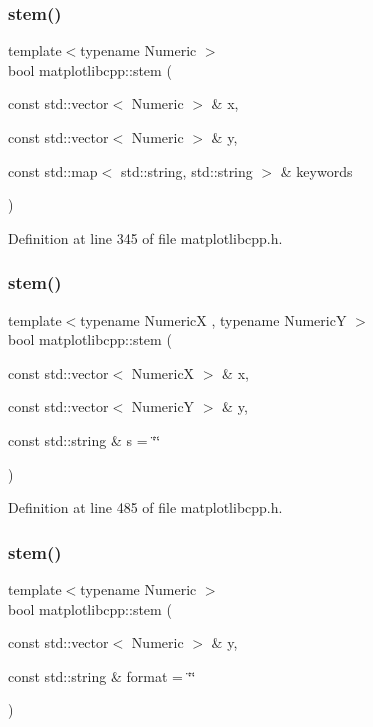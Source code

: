 \subsubsection{\texorpdfstring{stem()}{stem()}\hspace{0.1cm}{\footnotesize\ttfamily [1/3]}}
{\footnotesize\ttfamily template$<$typename Numeric $>$ \\
bool matplotlibcpp\+::stem (\begin{DoxyParamCaption}\item[{const std\+::vector$<$ Numeric $>$ \&}]{x,  }\item[{const std\+::vector$<$ Numeric $>$ \&}]{y,  }\item[{const std\+::map$<$ std\+::string, std\+::string $>$ \&}]{keywords }\end{DoxyParamCaption})}



Definition at line 345 of file matplotlibcpp.\+h.

\mbox{\label{namespacematplotlibcpp_a02a1939d1d0b7b61878bd7cf2d8cd7f3}} 
\subsubsection{\texorpdfstring{stem()}{stem()}\hspace{0.1cm}{\footnotesize\ttfamily [2/3]}}
{\footnotesize\ttfamily template$<$typename NumericX , typename NumericY $>$ \\
bool matplotlibcpp\+::stem (\begin{DoxyParamCaption}\item[{const std\+::vector$<$ NumericX $>$ \&}]{x,  }\item[{const std\+::vector$<$ NumericY $>$ \&}]{y,  }\item[{const std\+::string \&}]{s = {\ttfamily \char`\"{}\char`\"{}} }\end{DoxyParamCaption})}



Definition at line 485 of file matplotlibcpp.\+h.

\mbox{\label{namespacematplotlibcpp_a40ac4e0d416fad21899637dcf8d281c6}} 
\subsubsection{\texorpdfstring{stem()}{stem()}\hspace{0.1cm}{\footnotesize\ttfamily [3/3]}}
{\footnotesize\ttfamily template$<$typename Numeric $>$ \\
bool matplotlibcpp\+::stem (\begin{DoxyParamCaption}\item[{const std\+::vector$<$ Numeric $>$ \&}]{y,  }\item[{const std\+::string \&}]{format = {\ttfamily \char`\"{}\char`\"{}} }\end{DoxyParamCaption})}



